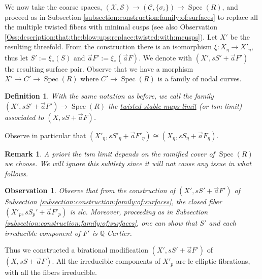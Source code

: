 \documentclass[11pt]{amsart}
\newcommand{\sC}{\mathscr{C}}
\newcommand{\sS}{\mathscr{S}}
\newcommand{\sX}{\mathscr{X}}
\newcommand{\spec}{\operatorname{Spec}}
\newtheorem{Def}[theorem]{Definition}
\newtheorem{Oss}[theorem]{Observation}
\newtheorem{Remark}[theorem]{Remark}
\theoremstyle{definition}
\begin{document}
We now take the coarse spaces, $(\sX, \sS) \to (\sC, \{\sigma_i\}) \to \spec(R)$, and proceed as in Subsection
\ref{subsection:construction:family:of:surfaces} to replace all the multiple twisted fibers with minimal cusps (see also Observation \ref{Oss:description:that:the:blow:ups:replace:twisted:with:mcusps}).
Let $X'$ be the resulting threefold.
From the construction there is an isomorphism $\xi:X_\eta \to X'_\eta$, thus let $S':=\xi_*(S)$ and $\vec{a}F':=\xi_*(\vec{a}F)$.
We denote with $(X',sS'+\vec{a}F')$ the resulting surface pair.
Observe that we have a morphism $X' \to C'\to \spec(R)$ where $C' \to \spec(R)$ is a family of nodal curves.
\begin{Def}\label{Def:tsm:limit}
 With the same notation as before,
 we call the family $(X',sS'+\vec{a}F') \to \spec(R)$ the \underline{twisted stable maps-limit} (or tsm limit) associated to
 $(X,sS+\vec{a}F)$. 
\end{Def}
Observe in particular that $(X'_\eta,sS'_\eta+\vec{a}F'_\eta) \cong (X_\eta,sS_\eta+\vec{a}F_\eta)$.
\begin{Remark}
 A priori the tsm limit depends on the ramified cover of $\spec(R)$ we choose. We will ignore this subtlety since it will not cause any issue in what follows.
\end{Remark}
\begin{Oss}\label{Oss:cosed:fiber:tsm:limit:is:lc}
Observe that from the construction of $(X',sS'+\vec{a}F')$ of Subsection \ref{subsection:construction:family:of:surfaces}, the closed fiber $(X'_p,sS_p'+\vec{a}F'_p)$ is slc. Moreover, proceeding as in Subsection \ref{subsection:construction:family:of:surfaces}, one can show that $S'$ and each irreducible component of $F'$ is
 $\mathbb{Q}$-Cartier.\end{Oss}
Thus we constructed a birational modification $(X',sS'+\vec{a}F')$ of $(X,sS+\vec{a}F)$. All the irreducible components of $X'_p$
are lc elliptic fibrations, with all the fibers irreducible. 
\end{document}
